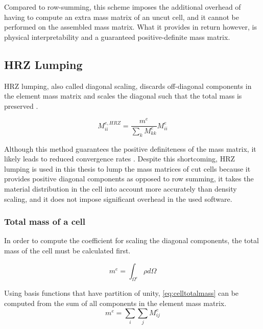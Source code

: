 Compared to row-summing, this scheme imposes the additional overhead of having
to compute an extra mass matrix of an uncut cell, and it cannot be performed
on the assembled mass matrix. What it provides in return however, is physical
interpretability and a guaranteed positive-definite mass matrix.

%
\subsection{HRZ Lumping}
\label{section:hrzlumping}
%

HRZ lumping, also called diagonal scaling, discards off-diagonal components in the
element mass matrix and scales the diagonal such that the total mass is preserved \cite{Hinton1976}.

\begin{equation} \label{eq:hrzlumping}
	M_{ii}^{e,HRZ} =
		\frac{m^e}{\sum_k M_{kk}^e} M_{ii}^e
\end{equation}

Although this method guarantees the positive definiteness of the mass matrix, it
likely leads to reduced convergence rates \cite{Duczek2019}. Despite this shortcoming,
HRZ lumping is used in this thesis to lump the mass matrices of cut cells because
it provides positive diagonal components as opposed to row summing, it takes the
material distribution in the cell into account more accurately than density scaling, and
it does not impose significant overhead in the used software.

\subsubsection*{Total mass of a cell}
\label{section:totalmassofacell}

In order to compute the coefficient for scaling the diagonal components, the total
mass of the cell must be calculated first.

\begin{equation} \label{eq:celltotalmass}
	m^e = \int_{\Omega^e} \rho d\Omega
\end{equation}

Using basis functions that have partition of unity, \ref{eq:celltotalmass} can
be computed from the sum of all components in the element mass matrix.
\begin{equation} \label{eq:sumofmassmatrixcomponents}
	m^e = \sum_i \sum_j M_{ij}^e
\end{equation}


